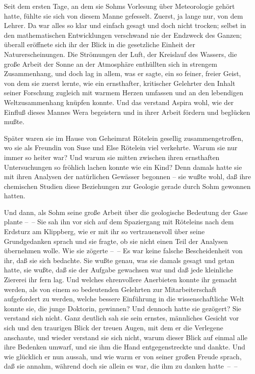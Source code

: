 Seit dem ersten Tage, an dem sie Sohms Vorlesung über Meteorologie
gehört hatte, fühlte sie sich von diesem Manne gefesselt. Zuerst,
ja lange nur, von dem Lehrer. Da war alles so klar und einfach
gesagt und doch nicht trocken; selbst in den mathematischen
Entwicklungen verschwand nie der Endzweck des Ganzen; überall
eröffnete sich ihr der Blick in die gesetzliche Einheit der
Naturerscheinungen. Die Strömungen der Luft, der Kreislauf des
Wassers, die große Arbeit der Sonne an der Atmosphäre enthüllten
sich in strengem Zusammenhang, und doch lag in allem, was er sagte,
ein so feiner, freier Geist, von dem sie zuerst lernte, wie ein
ernsthafter, kritischer Gelehrter den Inhalt seiner Forschung
zugleich mit warmem Herzen umfassen und an den lebendigen
Weltzusammenhang knüpfen konnte. Und das verstand Aspira wohl, wie
der Einfluß dieses Mannes Wera begeistern und in ihrer Arbeit
fördern und beglücken mußte.

Später waren sie im Hause von Geheimrat Rötelein gesellig
zusammengetroffen, wo sie als Freundin von Suse und Else Rötelein
viel verkehrte. Warum sie nur immer so heiter war? Und warum sie
mitten zwischen ihren ernsthaften Untersuchungen so fröhlich lachen
konnte wie ein Kind? Denn damals hatte sie mit ihren Analysen der
natürlichen Gewässer begonnen – sie wußte wohl, daß ihre chemischen
Studien diese Beziehungen zur Geologie gerade durch Sohm gewonnen
hatten.

Und dann, als Sohm seine große Arbeit über die geologische
Bedeutung der Gase plante –~– Sie sah ihn vor sich auf dem
Spaziergang mit Röteleins nach dem Erdsturz am Klippberg, wie er
mit ihr so vertrauensvoll über seine Grundgedanken sprach und sie
fragte, ob sie nicht einen Teil der Analysen übernehmen wolle. Wie
sie zögerte –~– Es war keine falsche Bescheidenheit von ihr, daß
sie sich bedachte. Sie wußte genau, was sie damals gesagt und getan
hatte, sie wußte, daß sie der Aufgabe gewachsen war und daß jede
kleinliche Ziererei ihr fern lag. Und welches ehrenvollere
Anerbieten konnte ihr gemacht werden, als von einem so bedeutenden
Gelehrten zur Mitarbeiterschaft aufgefordert zu werden, welche
bessere Einführung in die wissenschaftliche Welt konnte sie, die
junge Doktorin, gewinnen? Und dennoch hatte sie gezögert? Sie
verstand sich nicht. Ganz deutlich sah sie sein ernstes, männliches
Gesicht vor sich und den traurigen Blick der treuen Augen, mit dem
er die Verlegene anschaute, und wieder verstand sie sich nicht,
warum dieser Blick auf einmal alle ihre Bedenken umwarf, und sie
ihm die Hand entgegenstreckte und dankte. Und wie glücklich er nun
aussah, und wie warm er von seiner großen Freude sprach, daß sie
annahm, während doch sie allein es war, die ihm zu danken
hatte~–~–

